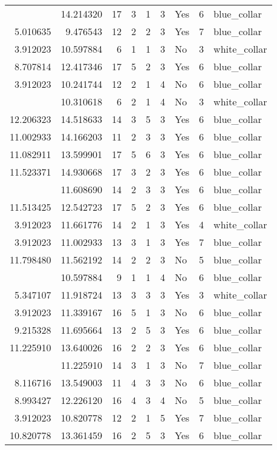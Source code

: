 \documentclass[
]{article}
\begin{document}
\begin{longtable}[t]{rrrrrllrl}
\addlinespace
3.912023 & 14.214320 & 17 & 3 & 1 & 3 & Yes & 6 & blue\_collar\\
5.010635 & 9.476543 & 12 & 2 & 2 & 3 & Yes & 7 & blue\_collar\\
3.912023 & 10.597884 & 6 & 1 & 1 & 3 & No & 3 & white\_collar\\
8.707814 & 12.417346 & 17 & 5 & 2 & 3 & Yes & 6 & blue\_collar\\
3.912023 & 10.241744 & 12 & 2 & 1 & 4 & No & 6 & blue\_collar\\
\addlinespace
3.912023 & 10.310618 & 6 & 2 & 1 & 4 & No & 3 & white\_collar\\
12.206323 & 14.518633 & 14 & 3 & 5 & 3 & Yes & 6 & blue\_collar\\
11.002933 & 14.166203 & 11 & 2 & 3 & 3 & Yes & 6 & blue\_collar\\
11.082911 & 13.599901 & 17 & 5 & 6 & 3 & Yes & 6 & blue\_collar\\
11.523371 & 14.930668 & 17 & 3 & 2 & 3 & Yes & 6 & blue\_collar\\
\addlinespace
8.527143 & 11.608690 & 14 & 2 & 3 & 3 & Yes & 6 & blue\_collar\\
11.513425 & 12.542723 & 17 & 5 & 2 & 3 & Yes & 6 & blue\_collar\\
3.912023 & 11.661776 & 14 & 2 & 1 & 3 & Yes & 4 & white\_collar\\
3.912023 & 11.002933 & 13 & 3 & 1 & 3 & Yes & 7 & blue\_collar\\
11.798480 & 11.562192 & 14 & 2 & 2 & 3 & No & 5 & blue\_collar\\
\addlinespace
3.912023 & 10.597884 & 9 & 1 & 1 & 4 & No & 6 & blue\_collar\\
5.347107 & 11.918724 & 13 & 3 & 3 & 3 & Yes & 3 & white\_collar\\
3.912023 & 11.339167 & 16 & 5 & 1 & 3 & No & 6 & blue\_collar\\
9.215328 & 11.695664 & 13 & 2 & 5 & 3 & Yes & 6 & blue\_collar\\
11.225910 & 13.640026 & 16 & 2 & 2 & 3 & Yes & 6 & blue\_collar\\
\addlinespace
3.912023 & 11.225910 & 14 & 3 & 1 & 3 & No & 7 & blue\_collar\\
8.116716 & 13.549003 & 11 & 4 & 3 & 3 & No & 6 & blue\_collar\\
8.993427 & 12.226120 & 16 & 4 & 3 & 4 & No & 5 & blue\_collar\\
3.912023 & 10.820778 & 12 & 2 & 1 & 5 & Yes & 7 & blue\_collar\\
10.820778 & 13.361459 & 16 & 2 & 5 & 3 & Yes & 6 & blue\_collar\\

\end{longtable}
\end{document}
